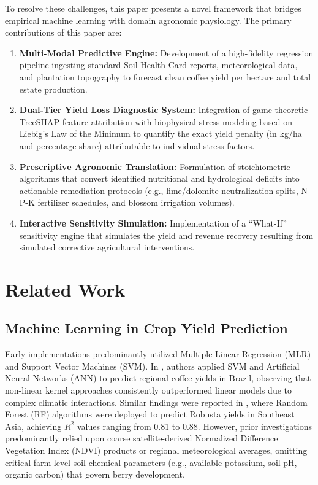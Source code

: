 \documentclass[conference]{IEEEtran}
\begin{document}
To resolve these challenges, this paper presents a novel framework that bridges empirical machine learning with domain agronomic physiology. The primary contributions of this paper are:
\begin{enumerate}
    \item \textbf{Multi-Modal Predictive Engine:} Development of a high-fidelity regression pipeline ingesting standard Soil Health Card reports, meteorological data, and plantation topography to forecast clean coffee yield per hectare and total estate production.
    \item \textbf{Dual-Tier Yield Loss Diagnostic System:} Integration of game-theoretic TreeSHAP feature attribution with biophysical stress modeling based on Liebig's Law of the Minimum to quantify the exact yield penalty (in kg/ha and percentage share) attributable to individual stress factors.
    \item \textbf{Prescriptive Agronomic Translation:} Formulation of stoichiometric algorithms that convert identified nutritional and hydrological deficits into actionable remediation protocols (e.g., lime/dolomite neutralization splits, N-P-K fertilizer schedules, and blossom irrigation volumes).
    \item \textbf{Interactive Sensitivity Simulation:} Implementation of a ``What-If'' sensitivity engine that simulates the yield and revenue recovery resulting from simulated corrective agricultural interventions.
\end{enumerate}

\section{Related Work}
\subsection{Machine Learning in Crop Yield Prediction}
Early implementations predominantly utilized Multiple Linear Regression (MLR) and Support Vector Machines (SVM). In \cite{everingham2021}, authors applied SVM and Artificial Neural Networks (ANN) to predict regional coffee yields in Brazil, observing that non-linear kernel approaches consistently outperformed linear models due to complex climatic interactions. Similar findings were reported in \cite{nguyen2022}, where Random Forest (RF) algorithms were deployed to predict Robusta yields in Southeast Asia, achieving $R^2$ values ranging from 0.81 to 0.88. However, prior investigations predominantly relied upon coarse satellite-derived Normalized Difference Vegetation Index (NDVI) products or regional meteorological averages, omitting critical farm-level soil chemical parameters (e.g., available potassium, soil pH, organic carbon) that govern berry development.
\end{document}
